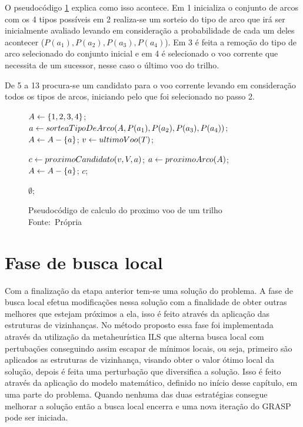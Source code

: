 O pseudocódigo \ref{alg:calcvoo} explica como isso acontece. Em 1 inicializa o
conjunto de arcos com os 4 tipos possíveis em 2 realiza-se um sorteio do tipo de
arco que irá ser inicialmente avaliado levando em consideração a probabilidade
de cada um deles acontecer ($P(a_{1}), P(a_{2}), P(a_{3}), P(a_{4})$). Em 3 é
feita a remoção do tipo de arco selecionado do conjunto inicial e em 4
é selecionado o voo corrente que necessita de um sucessor, nesse caso o último
voo do trilho.

De 5 a 13 procura-se um candidato para o voo corrente levando em consideração
todos os tipos de arcos, iniciando pelo que foi selecionado no passo 2.

\begin{figure}[h]
\caption{Pseudocódigo de calculo do proximo voo de um trilho
\newline
\mbox{Fonte: Própria}}\label{alg:calcvoo}
\begin{programma}

\STATE $A \leftarrow \{1,2,3,4\}$;
\STATE $a \leftarrow sorteaTipoDeArco(A, P(a_{1}),P(a_{2}),P(a_{3}),P(a_{4}))$;
\STATE $A \leftarrow A - \{a\}$; \STATE $v \leftarrow ultimoVoo(T)$;

\STATE $c \leftarrow proximoCandidato(v, V, a)$;
	\STATE $a \leftarrow proximoArco(A)$;
	\STATE $A \leftarrow A - \{a\}$;
\ELSE
	\STATE\RETURN $c$;
\ENDIF 
\ENDFOR

\STATE\RETURN $\emptyset$;

\ENDALGORITHM
\end{programma}
\end{figure}
 
 \section{Fase de busca local}

Com a finalização da etapa anterior tem-se uma solução do problema. A fase de busca
local efetua modificações nessa solução com a finalidade de obter outras
melhores que estejam próximos a ela, isso é feito através da aplicação das
estruturas de vizinhanças. No método proposto essa fase foi implementada através
da utilização da metaheurística ILS que alterna busca local com pertubações
conseguindo assim escapar de mínimos locais, ou seja, primeiro são aplicados as
estruturas de vizinhança, visando obter o valor ótimo local da solução, depois
é feita uma perturbação que diversifica a solução. Isso é feito através da
aplicação do modelo matemático, definido no início desse capítulo, em uma parte
do problema. Quando nenhuma das duas estratégias consegue melhorar a solução
então a busca local encerra e uma nova iteração do GRASP pode ser iniciada.
 
